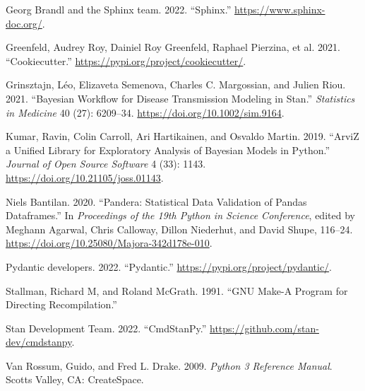 \documentclass[
  letterpaper,
  DIV=11,
  numbers=noendperiod]{scrartcl}
\newlength{\cslhangindent}
\newlength{\cslentryspacingunit} %
\newenvironment{CSLReferences}[2] %
 {%
  \setlength{\parindent}{0pt}
  \ifodd #1
  \let\oldpar\par
  \def\par{\hangindent=\cslhangindent\oldpar}
  \fi
  \setlength{\parskip}{#2\cslentryspacingunit}
 }%
 {}
\begin{document}
\begin{CSLReferences}{1}{0}
\leavevmode{}%
Georg Brandl and the Sphinx team. 2022. {``Sphinx.''}
\url{https://www.sphinx-doc.org/}.

\leavevmode{}%
Greenfeld, Audrey Roy, Dainiel Roy Greenfeld, Raphael Pierzina, et al.
2021. {``Cookiecutter.''} \url{https://pypi.org/project/cookiecutter/}.

\leavevmode{}%
Grinsztajn, Léo, Elizaveta Semenova, Charles C. Margossian, and Julien
Riou. 2021. {``Bayesian Workflow for Disease Transmission Modeling in
{Stan}.''} \emph{Statistics in Medicine} 40 (27): 6209--34.
\url{https://doi.org/10.1002/sim.9164}.

\leavevmode{}%
Kumar, Ravin, Colin Carroll, Ari Hartikainen, and Osvaldo Martin. 2019.
{``{ArviZ} a Unified Library for Exploratory Analysis of {Bayesian}
Models in {Python}.''} \emph{Journal of Open Source Software} 4 (33):
1143. \url{https://doi.org/10.21105/joss.01143}.

\leavevmode{}%
Niels Bantilan. 2020. {``Pandera: {Statistical Data Validation} of
{Pandas Dataframes}.''} In \emph{Proceedings of the 19th {Python} in
{Science Conference}}, edited by Meghann Agarwal, Chris Calloway, Dillon
Niederhut, and David Shupe, 116--24.
\url{https://doi.org/10.25080/Majora-342d178e-010}.

\leavevmode{}%
Pydantic developers. 2022. {``Pydantic.''}
\url{https://pypi.org/project/pydantic/}.

\leavevmode{}%
Stallman, Richard M, and Roland McGrath. 1991. {``{GNU} Make-{A} Program
for Directing Recompilation.''}

\leavevmode{}%
Stan Development Team. 2022. {``{CmdStanPy}.''}
\url{https://github.com/stan-dev/cmdstanpy}.

\leavevmode{}%
Van Rossum, Guido, and Fred L. Drake. 2009. \emph{Python 3 {Reference
Manual}}. {Scotts Valley, CA}: {CreateSpace}.

\end{CSLReferences}
\end{document}
